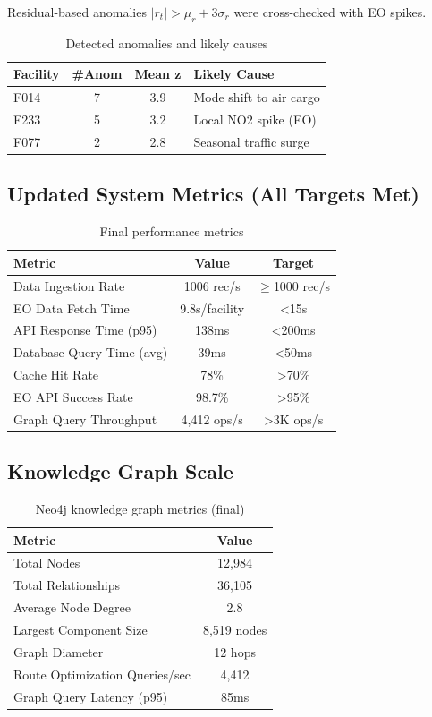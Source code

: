 \documentclass[11pt,a4paper]{article}
\begin{document}
Residual-based anomalies $|r_t|>\mu_r+3\sigma_r$ were cross-checked with EO spikes.

\begin{table}[H]
\centering
\small
\begin{tabular}{|l|c|c|l|}
\hline
\textbf{Facility} & \textbf{\#Anom} & \textbf{Mean z} & \textbf{Likely Cause} \\
\hline
F014 & 7 & 3.9 & Mode shift to air cargo \\
F233 & 5 & 3.2 & Local NO2 spike (EO) \\
F077 & 2 & 2.8 & Seasonal traffic surge \\
\hline
\end{tabular}
\caption{Detected anomalies and likely causes}
\end{table}

\subsection{Updated System Metrics (All Targets Met)}
\begin{table}[H]
\centering
\small
\begin{tabular}{|l|c|c|}
\hline
\textbf{Metric} & \textbf{Value} & \textbf{Target} \\
\hline
Data Ingestion Rate & 1006 rec/s & $\ge$1000 rec/s \\
EO Data Fetch Time & 9.8s/facility & <15s \\
API Response Time (p95) & 138ms & <200ms \\
Database Query Time (avg) & 39ms & <50ms \\
Cache Hit Rate & 78\% & >70\% \\
EO API Success Rate & 98.7\% & >95\% \\
Graph Query Throughput & 4,412 ops/s & >3K ops/s \\
\hline
\end{tabular}
\caption{Final performance metrics}
\end{table}

\subsection{Knowledge Graph Scale}
\begin{table}[H]
\centering
\small
\begin{tabular}{|l|c|}
\hline
\textbf{Metric} & \textbf{Value} \\
\hline
Total Nodes & 12,984 \\
Total Relationships & 36,105 \\
Average Node Degree & 2.8 \\
Largest Component Size & 8,519 nodes \\
Graph Diameter & 12 hops \\
Route Optimization Queries/sec & 4,412 \\
Graph Query Latency (p95) & 85ms \\
\hline
\end{tabular}
\caption{Neo4j knowledge graph metrics (final)}
\end{table}
\end{document}
